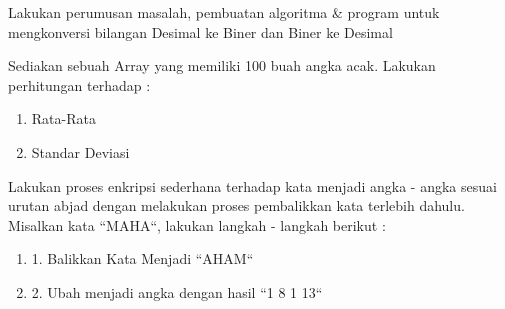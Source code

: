 \begin{pemrograman}
Lakukan perumusan masalah, pembuatan algoritma \& program untuk mengkonversi bilangan Desimal ke Biner dan Biner ke Desimal
\end{pemrograman}

\begin{pemrograman}
Sediakan sebuah Array yang memiliki 100 buah angka acak. Lakukan perhitungan terhadap : 
\begin{enumerate}
	\item Rata-Rata
	\item Standar Deviasi
\end{enumerate}
\end{pemrograman}

\begin{pemrograman}
Lakukan proses enkripsi sederhana terhadap kata menjadi angka - angka sesuai urutan abjad dengan melakukan proses pembalikkan kata terlebih dahulu. Misalkan kata ``MAHA``, lakukan langkah - langkah berikut :
\begin{enumerate}
	\item 1. Balikkan Kata Menjadi ``AHAM``
	\item 2. Ubah menjadi angka dengan hasil ``1 8 1 13``
\end{enumerate}
\end{pemrograman}



